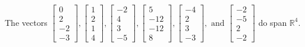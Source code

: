\begin{exercise}
\begin{exerciseStatement}
  \end{exerciseStatement}
  \begin{exerciseAnswer}
   The vectors \(\left[\begin{array}{r}
0 \\
2 \\
-2 \\
-3
\end{array}\right] , \left[\begin{array}{r}
1 \\
2 \\
1 \\
4
\end{array}\right] , \left[\begin{array}{r}
-2 \\
4 \\
3 \\
-5
\end{array}\right] , \left[\begin{array}{r}
5 \\
-12 \\
-12 \\
8
\end{array}\right] , \left[\begin{array}{r}
-4 \\
2 \\
3 \\
-3
\end{array}\right] , \text{ and } \left[\begin{array}{r}
-2 \\
-5 \\
2 \\
-2
\end{array}\right]\) 
  	 do  
	span \(\mathbb{R}^4\).
  


  \end{exerciseAnswer}
\end{exercise}